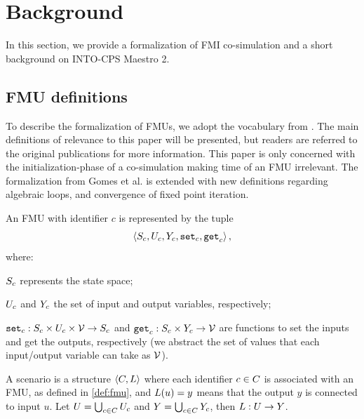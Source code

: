 
\section{Background}\label{sc:background}
In this section, we provide a formalization of FMI co-simulation and a short background on INTO-CPS Maestro 2.

\subsection{FMU definitions}
To describe the formalization of FMUs, we adopt the vocabulary from \cite{gomes_lucio_vangheluwe_2019,Gomes2018}. The main definitions of relevance to this paper will be presented, but readers are referred to the original publications for more information. This paper is only concerned with the initialization-phase of a co-simulation making time of an FMU irrelevant. The formalization from Gomes et al. is extended with new definitions regarding algebraic loops, and convergence of fixed point iteration.
\begin{definition}[FMU]\label{def:fmu}
  An FMU with identifier $c$ is represented by the tuple   
  $$ \left\langle S_{c}, U_{c}, Y_{c}, \mathtt{set}_{c}, \mathtt{get}_{c} \right\rangle ,$$
  where:
  \begin{inparadesc}
    \item $S_{c}$ represents the state space;
    \item $U_{c}$ and $Y_{c}$ the set of input and output variables, respectively;
    \item $\mathtt{set}_{c} : S_{c} \times U_{c} \times \mathcal{V} \to S_{c}$ and $\mathtt{get}_{c}: S_{c} \times Y_{c} \to \mathcal{V}$ are functions to set the inputs and get the outputs, respectively (we abstract the set of values that each input/output variable can take as $\mathcal{V}$).
  \end{inparadesc}
\end{definition}

\begin{definition}[Scenario]\label{def:cosim_scenario}
  A scenario is a structure $ \left\langle C, L \right\rangle $ where each identifier $c \in C$ is associated with an FMU, as defined in \ref{def:fmu}, and $L(u)=y$ means that the output $y$ is connected to input $u$.
  Let $U = \bigcup_{c \in C} U_{c}$ and $Y = \bigcup_{c \in C} Y_{c}$, then $L : U \to Y$.
\end{definition}


